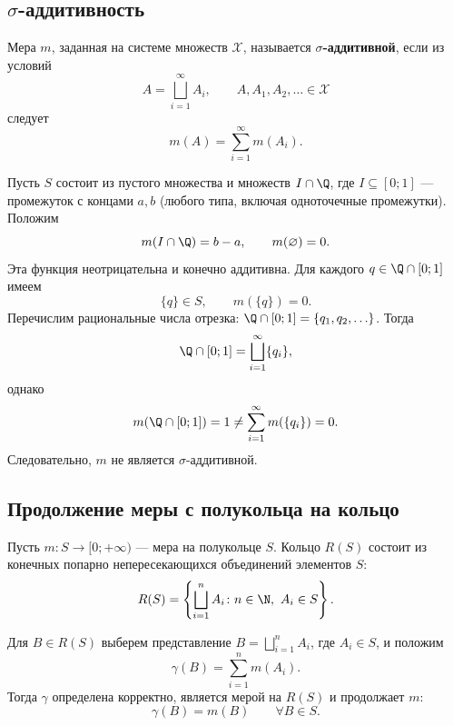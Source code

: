 \subsection{\texorpdfstring{$\sigma$}{σ}-аддитивность}

\begin{definition}
    Мера $m$, заданная на системе множеств $\mathcal{X}$,
    называется \textbf{$\sigma$-аддитивной}, если из условий
    \[
        A=\bigsqcup_{i=1}^{\infty}A_i,
        \qquad A,A_1,A_2,\ldots\in\mathcal{X}
    \]
    следует
    \[
        m(A)=\sum_{i=1}^{\infty}m(A_i).
    \]
\end{definition}

\begin{example}
    Пусть $S$ состоит из пустого множества и множеств $I\cap\Q$,
    где $I\subseteq[0;1]$ --- промежуток с концами $a,b$
    (любого типа, включая одноточечные промежутки).
    Положим
    \[
        m(I\cap\Q)=b-a,\qquad m(\varnothing)=0.
    \]
    Эта функция неотрицательна и конечно аддитивна.
    Для каждого $q\in\Q\cap[0;1]$ имеем
    \[
        \{q\}\in S,\qquad m(\{q\})=0.
    \]
    Перечислим рациональные числа отрезка:
    $\Q\cap[0;1]=\{q_1,q_2,\ldots\}$. Тогда
    \[
        \Q\cap[0;1]=\bigsqcup_{i=1}^{\infty}\{q_i\},
    \]
    однако
    \[
        m(\Q\cap[0;1])=1
        \ne\sum_{i=1}^{\infty}m(\{q_i\})=0.
    \]
    Следовательно, $m$ не является $\sigma$-аддитивной.
\end{example}

\clearpage


\subsection{Продолжение меры с полукольца на кольцо}

Пусть $m\colon S\to[0;+\infty)$ --- мера на полукольце $S$.
Кольцо $R(S)$ состоит из конечных попарно непересекающихся
объединений элементов $S$:
\[
    R(S)=\left\{\bigsqcup_{i=1}^{n}A_i\colon
        n\in\N,\ A_i\in S\right\}.
\]

\begin{theorem}
    Для $B\in R(S)$ выберем представление
    $B=\bigsqcup_{i=1}^{n}A_i$, где $A_i\in S$, и положим
    \[
        \gamma(B)=\sum_{i=1}^{n}m(A_i).
    \]
    Тогда $\gamma$ определена корректно, является мерой на $R(S)$
    и продолжает $m$:
    \[
        \gamma(B)=m(B)\qquad\forall B\in S.
    \]
\end{theorem}

